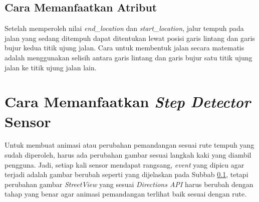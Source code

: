\subsection{Cara Memanfaatkan Atribut}
\label{subs:directions-attr-use}
Setelah memperoleh nilai \textit{end\_location} dan \textit{start\_location}, jalur tempuh pada jalan yang sedang ditempuh dapat ditentukan lewat posisi garis lintang dan garis bujur kedua titik ujung jalan. Cara untuk membentuk jalan secara matematis adalah menggunakan selisih antara garis lintang dan garis bujur satu titik ujung jalan ke titik ujung jalan lain. 


\section{Cara Memanfaatkan \textit{Step Detector} Sensor}
Untuk membuat animasi atau perubahan pemandangan sesuai rute tempuh yang sudah diperoleh, harus ada perubahan gambar sesuai langkah kaki yang diambil pengguna. Jadi, setiap kali sensor mendapat rangsang, \textit{event} yang dipicu agar terjadi adalah gambar berubah seperti yang dijelaskan pada Subbab \ref{subs:directions-attr-use}, tetapi perubahan gambar \textit{StreetView} yang sesuai \textit{Directions API} harus berubah dengan tahap yang benar agar animasi pemandangan terlihat baik sesuai dengan rute. 